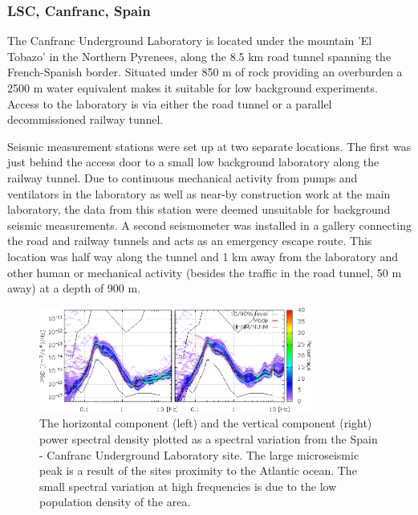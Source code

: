 \subsubsection*{LSC, Canfranc, Spain}
\label{sec:spain}
The Canfranc Underground Laboratory is located under the mountain 'El Tobazo' in the Northern Pyrenees, along the 8.5 km road tunnel spanning the French-Spanish border. Situated under 850 m of rock providing an overburden a 2500 m water equivalent makes it suitable for low background experiments. Access to the laboratory is via either the road tunnel or a parallel decommissioned railway tunnel. 

Seismic measurement stations were set up at two separate locations. The first was just behind the access door to a small low background laboratory along the railway tunnel. Due to continuous mechanical activity from pumps and ventilators in the laboratory as well as near-by construction work at the main laboratory, the data from this station were deemed unsuitable for background seismic measurements. A second seismometer was installed in a gallery connecting the road and railway tunnels and acts as an emergency escape route. This location was half way along the tunnel and 1 km away from the laboratory and other human or mechanical activity (besides the traffic in the road tunnel, 50 m away) at a depth of 900 m. 

\begin{figure}[h]
	\begin{center}
		\includegraphics[width=0.8\textwidth]{./Sec_SiteInfra/Figures/Canfranc-B_multiplot1}
		\caption{The horizontal component (left) and the vertical component (right) power spectral density plotted as a spectral variation from the Spain - Canfranc Underground Laboratory site. The large microseismic peak is a result of the sites proximity to the Atlantic ocean. The small spectral variation at high frequencies is due to the low population density of the area.}
		\label{Canfranc-B1}
		\end{center}
\end{figure}

